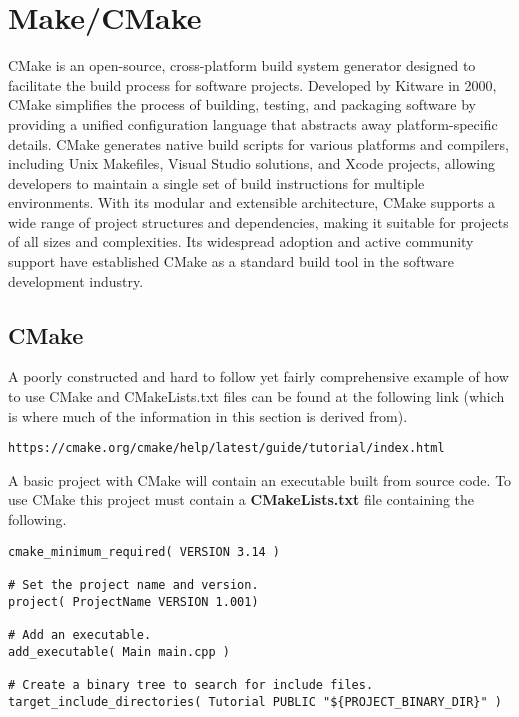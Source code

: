 \chapter{Make/CMake}
\thispagestyle{fancy}
\lstset{language=make, style=makestyle}

CMake is an open-source, cross-platform build system generator designed to facilitate the build process for software projects. Developed by Kitware in 2000, CMake simplifies the process of building, testing, and packaging software by providing a unified configuration language that abstracts away platform-specific details. CMake generates native build scripts for various platforms and compilers, including Unix Makefiles, Visual Studio solutions, and Xcode projects, allowing developers to maintain a single set of build instructions for multiple environments. With its modular and extensible architecture, CMake supports a wide range of project structures and dependencies, making it suitable for projects of all sizes and complexities. Its widespread adoption and active community support have established CMake as a standard build tool in the software development industry.

\section{CMake}

A poorly constructed and hard to follow yet fairly comprehensive example of how to use CMake and CMakeLists.txt files can be found at the following link (which is where much of the information in this section is derived from).
\begin{lstlisting}
https://cmake.org/cmake/help/latest/guide/tutorial/index.html
\end{lstlisting}

A basic project with CMake will contain an executable built from source code. To use CMake this project must contain a \textbf{CMakeLists.txt} file containing the following.
\begin{lstlisting}
cmake_minimum_required( VERSION 3.14 )

# Set the project name and version.
project( ProjectName VERSION 1.001)

# Add an executable.
add_executable( Main main.cpp )

# Create a binary tree to search for include files.
target_include_directories( Tutorial PUBLIC "${PROJECT_BINARY_DIR}" )
\end{lstlisting}

